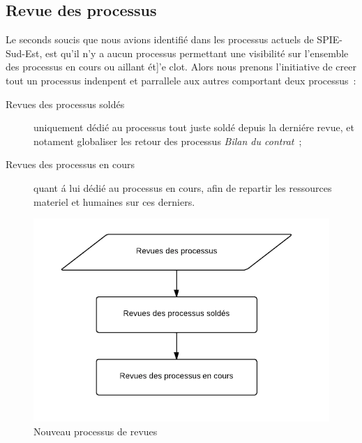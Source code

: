 \subsection{Revue des processus}

Le seconds soucis que nous avions identifi\'e dans les processus actuels de SPIE-Sud-Est, est qu'il n'y a aucun processus permettant une visibilit\'e sur l'ensemble des processus en cours ou aillant
\'et]'e clot. Alors nous prenons l'initiative de creer tout un processus indenpent et parrallele aux autres comportant deux processus~:

\begin{description}
    \item[Revues des processus sold\'es] uniquement d\'edi\'e au processus tout juste sold\'e depuis la derni\'ere revue, et notament globaliser les retour des processus \textit{Bilan du contrat}~;
    \item[Revues des processus en cours] quant \'a lui d\'edi\'e au processus en cours, afin de repartir les ressources materiel et humaines sur ces derniers.
\end{description}

\begin{figure}[h!]
	\centering
	\includegraphics[width=0.45\linewidth]{images/processus_revues.png}
	\caption{Nouveau processus de revues}
	\label{fig:processusRevue}
\end{figure}

